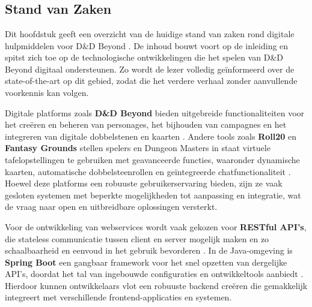 \chapter{}%
\label{ch:stand-van-zaken}



\section{Stand van Zaken}

Dit hoofdstuk geeft een overzicht van de huidige stand van zaken rond digitale hulpmiddelen voor D\&D Beyond \autocite{Bradford2025}. De inhoud bouwt voort op de inleiding en spitst zich toe op de technologische ontwikkelingen die het spelen van D\&D Beyond digitaal ondersteunen. Zo wordt de lezer volledig geïnformeerd over de state-of-the-art op dit gebied, zodat die het verdere verhaal zonder aanvullende voorkennis kan volgen.

Digitale platforms zoals \textbf{D\&D Beyond} bieden uitgebreide functionaliteiten voor het creëren en beheren van personages, het bijhouden van campagnes en het integreren van digitale dobbelstenen en kaarten \autocite{Bradford2025}. Andere tools zoals \textbf{Roll20} \autocite{Melzer2024} en \textbf{Fantasy Grounds} stellen spelers en Dungeon Masters in staat virtuele tafelopstellingen te gebruiken met geavanceerde functies, waaronder dynamische kaarten, automatische dobbelsteenrollen en geïntegreerde chatfunctionaliteit \autocite{Hall2015}. Hoewel deze platforms een robuuste gebruikerservaring bieden, zijn ze vaak gesloten systemen met beperkte mogelijkheden tot aanpassing en integratie, wat de vraag naar open en uitbreidbare oplossingen versterkt.

Voor de ontwikkeling van webservices wordt vaak gekozen voor \textbf{RESTful API's}, die stateless communicatie tussen client en server mogelijk maken en zo schaalbaarheid en eenvoud in het gebruik bevorderen \autocite{restfull}. In de Java-omgeving is \textbf{Spring Boot} een gangbaar framework voor het snel opzetten van dergelijke API's, doordat het tal van ingebouwde configuraties en ontwikkeltools aanbiedt \autocite{Pratik2024}. Hierdoor kunnen ontwikkelaars vlot een robuuste backend creëren die gemakkelijk integreert met verschillende frontend-applicaties en systemen.

